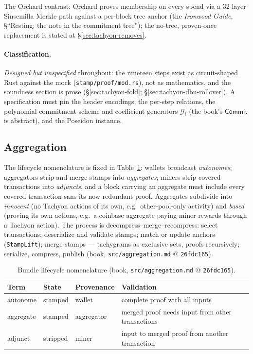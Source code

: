 \documentclass[11pt,a4paper]{article}
\theoremstyle{definition}
\newcommand{\Comm}{\mathsf{Commit}}
\begin{document}
The Orchard contrast: Orchard proves membership on every spend via a
32-layer Sinsemilla Merkle path against a per-block tree anchor (the
\emph{Ironwood Guide}, \S``Resting: the note in the commitment tree''); the
no-tree, proven-once replacement is stated at
\S\ref{sec:tachyon-removes}.

\paragraph{Classification.} \emph{Designed but unspecified} throughout:
the nineteen steps exist as circuit-shaped Rust against the mock
(\texttt{stamp/proof/mod.rs}), not as mathematics, and the soundness
section is prose (\S\ref{sec:tachyon-fold};
\S\ref{sec:tachyon-dbu-rollover}). A specification must pin the header
encodings, the per-step relations, the polynomial-commitment scheme and
coefficient generators $\mathcal{G}_i$ (the book's $\Comm$ is abstract),
and the Poseidon instance.

\FloatBarrier

\subsection{Aggregation}\label{sec:tachyon-design-agg}

The lifecycle nomenclature is fixed in
Table~\ref{tab:tachyon-design-agg}: wallets broadcast \emph{autonomes};
aggregators strip and merge stamps into \emph{aggregates}; miners strip
covered transactions into \emph{adjuncts}, and a block carrying an
aggregate must include every covered transaction sans its now-redundant
proof. Aggregates subdivide into \emph{innocent} (no Tachyon actions of
its own, e.g.\ other-pool-only activity) and \emph{based} (proving its own
actions, e.g.\ a coinbase aggregate paying miner rewards through a Tachyon
action). The process is decompress--merge--recompress: select
transactions; deserialize and validate stamps; match or update anchors
(\texttt{StampLift}); merge stamps --- tachygrams as exclusive sets,
proofs recursively; serialize, compress, publish (book,
\texttt{src/aggregation.md} @ \texttt{26fdc165}).

\begin{table}[htbp]
\centering
\small
\begin{tabular}{@{}llll@{}}
\toprule
Term & State & Provenance & Validation \\
\midrule
autonome  & stamped  & wallet     & complete proof with all inputs \\
aggregate & stamped  & aggregator & merged proof needs input from other
  transactions \\
adjunct   & stripped & miner      & input to merged proof from another
  transaction \\
\bottomrule
\end{tabular}
\caption{Bundle lifecycle nomenclature (book, \texttt{src/aggregation.md}
@ \texttt{26fdc165}).}
\label{tab:tachyon-design-agg}
\end{table}
\end{document}
